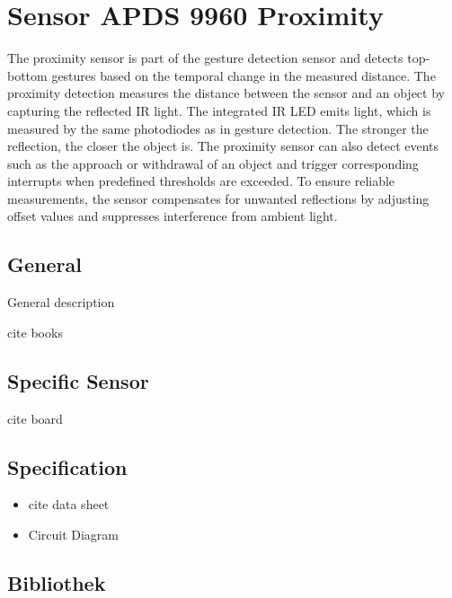 %
%

\chapter{Sensor APDS 9960 Proximity}

The proximity sensor is part of the gesture detection sensor and detects top-bottom gestures based on the temporal change in the measured distance. The proximity detection measures the distance between the sensor and an object by capturing the reflected IR light. The integrated IR LED emits light, which is measured by the same photodiodes as in gesture detection. The stronger the reflection, the closer the object is. The proximity sensor can also detect events such as the approach or withdrawal of an object and trigger corresponding interrupts when predefined thresholds are exceeded. To ensure reliable measurements, the sensor compensates for unwanted reflections by adjusting offset values and suppresses interference from ambient light.
\smallskip
\cite{Avago:2015}



\section{General}

General description

cite books

\section{Specific Sensor}

cite board

\section{Specification}

\begin{itemize}
  \item cite data sheet
  \item Circuit Diagram
\end{itemize}

\section{Bibliothek}

